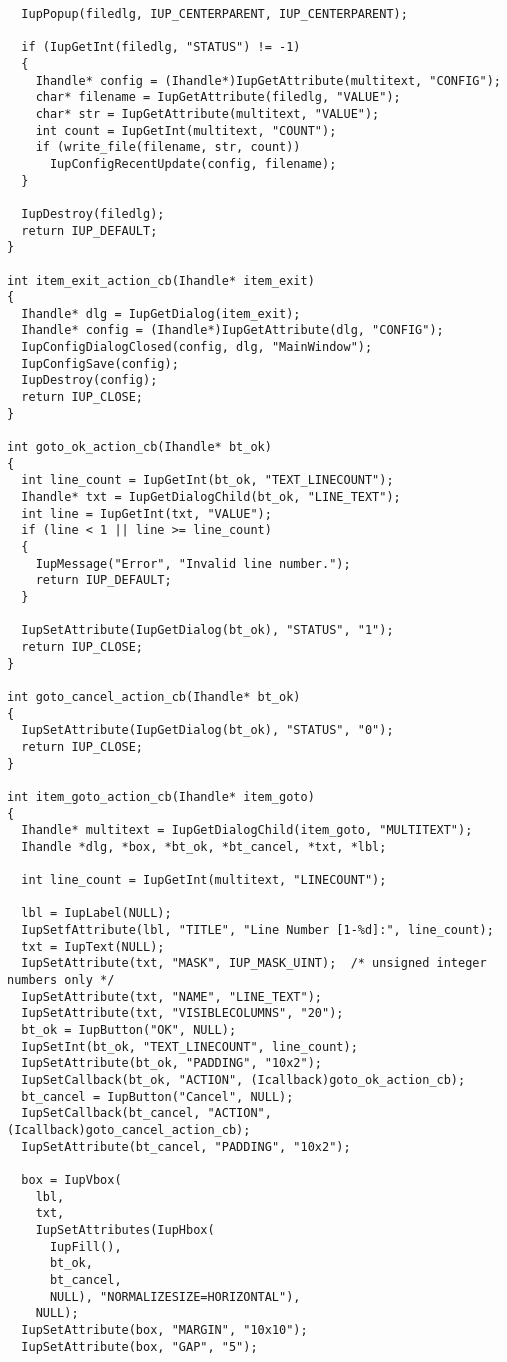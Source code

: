 \documentclass{ctexart}
\begin{document}
\begin{lstlisting}
  IupPopup(filedlg, IUP_CENTERPARENT, IUP_CENTERPARENT);

  if (IupGetInt(filedlg, "STATUS") != -1)
  {
    Ihandle* config = (Ihandle*)IupGetAttribute(multitext, "CONFIG");
    char* filename = IupGetAttribute(filedlg, "VALUE");
    char* str = IupGetAttribute(multitext, "VALUE");
    int count = IupGetInt(multitext, "COUNT");
    if (write_file(filename, str, count))
      IupConfigRecentUpdate(config, filename);
  }

  IupDestroy(filedlg);
  return IUP_DEFAULT;
}

int item_exit_action_cb(Ihandle* item_exit)
{
  Ihandle* dlg = IupGetDialog(item_exit);
  Ihandle* config = (Ihandle*)IupGetAttribute(dlg, "CONFIG");
  IupConfigDialogClosed(config, dlg, "MainWindow");
  IupConfigSave(config);
  IupDestroy(config);
  return IUP_CLOSE;
}

int goto_ok_action_cb(Ihandle* bt_ok)
{
  int line_count = IupGetInt(bt_ok, "TEXT_LINECOUNT");
  Ihandle* txt = IupGetDialogChild(bt_ok, "LINE_TEXT");
  int line = IupGetInt(txt, "VALUE");
  if (line < 1 || line >= line_count)
  {
    IupMessage("Error", "Invalid line number.");
    return IUP_DEFAULT;
  }

  IupSetAttribute(IupGetDialog(bt_ok), "STATUS", "1");
  return IUP_CLOSE;
}

int goto_cancel_action_cb(Ihandle* bt_ok)
{
  IupSetAttribute(IupGetDialog(bt_ok), "STATUS", "0");
  return IUP_CLOSE;
}

int item_goto_action_cb(Ihandle* item_goto)
{
  Ihandle* multitext = IupGetDialogChild(item_goto, "MULTITEXT");
  Ihandle *dlg, *box, *bt_ok, *bt_cancel, *txt, *lbl;

  int line_count = IupGetInt(multitext, "LINECOUNT");

  lbl = IupLabel(NULL);
  IupSetfAttribute(lbl, "TITLE", "Line Number [1-%d]:", line_count);
  txt = IupText(NULL);
  IupSetAttribute(txt, "MASK", IUP_MASK_UINT);  /* unsigned integer numbers only */
  IupSetAttribute(txt, "NAME", "LINE_TEXT");
  IupSetAttribute(txt, "VISIBLECOLUMNS", "20");
  bt_ok = IupButton("OK", NULL);
  IupSetInt(bt_ok, "TEXT_LINECOUNT", line_count);
  IupSetAttribute(bt_ok, "PADDING", "10x2");
  IupSetCallback(bt_ok, "ACTION", (Icallback)goto_ok_action_cb);
  bt_cancel = IupButton("Cancel", NULL);
  IupSetCallback(bt_cancel, "ACTION", (Icallback)goto_cancel_action_cb);
  IupSetAttribute(bt_cancel, "PADDING", "10x2");

  box = IupVbox(
    lbl,
    txt,
    IupSetAttributes(IupHbox(
      IupFill(),
      bt_ok,
      bt_cancel,
      NULL), "NORMALIZESIZE=HORIZONTAL"),
    NULL);
  IupSetAttribute(box, "MARGIN", "10x10");
  IupSetAttribute(box, "GAP", "5");


\end{lstlisting}
\end{document}
